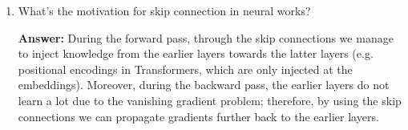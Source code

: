 \documentclass{article}
\newenvironment{QandA}{\begin{enumerate}[label=\arabic*.]}{\end{enumerate}}
\newenvironment{InnerQandA}{\begin{enumerate}[label=\roman*.]}{\end{enumerate}}
\newenvironment{answer}{\par\normalfont \textbf{Answer:}}{}
\newcommand{\R}{\mathbb{R}}
\begin{document}
\begin{QandA}
\begin{InnerQandA}
        \item Is ReLU differentiable? What to do when it’s not differentiable?
        \begin{answer}
            While ReLU is not differentiable at 0, we can use a faux gradient as follows:
            \begin{align*}
                \frac{\partial}{\partial x} \text{ReLU}(x) = \begin{cases}
                    x &\text{if } x \ge 0 \\
                    0 &\text{otherwise}
                \end{cases}
            \end{align*}
        \end{answer}

        \item Derive derivatives for sigmoid function $\sigma(x)$  when $x$ is a vector.
        \begin{answer}
            Previously, for $x \in \R$ we proved that:
            \begin{align*}
                \frac{\partial }{\partial x} \sigma(x) = \sigma(x)(1-\sigma(x))
            \end{align*}
            Since the activation function is applied element-wise, then the derivative when $x$ is a vector generalizes to a Hadamard product:
            \begin{align*}
                \frac{\partial }{\partial x} \sigma(x) = \sigma(x) \otimes (1-\sigma(x))
            \end{align*}
        \end{answer}
    \end{InnerQandA}

    \item What’s the motivation for skip connection in neural works?
    \begin{answer}
        During the forward pass, through the skip connections we manage to inject knowledge from the earlier layers towards the latter layers (e.g. positional encodings in Transformers, which are only injected at the embeddings). Moreover, during the backward pass, the earlier layers do not learn a lot due to the vanishing gradient problem; therefore, by using the skip connections we can propagate gradients further back to the earlier layers.
    \end{answer}


\end{QandA}
\end{document}
